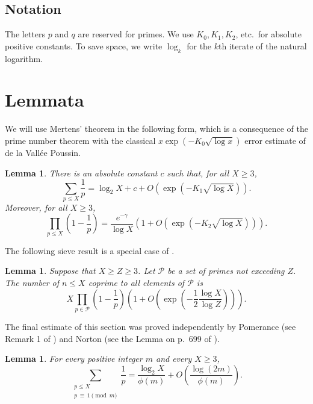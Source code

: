 \documentclass[11pt]{amsart}
\newtheorem{lem}[thm]{Lemma}
\theoremstyle{remark}
\begin{document}
\subsection*{Notation} The letters $p$ and $q$ are reserved for primes. We use $K_0, K_1, K_2$, etc.\ for absolute positive constants. To save space, we write $\log_k$ for the $k$th iterate of the natural logarithm.

\section{Lemmata}
We will use Mertens' theorem in the following form, which is a consequence of the prime number theorem with the classical $x\exp(-K_0\sqrt{\log{x}})$ error estimate of de la Vall\'ee Poussin.

\begin{lem}\label{lem:mertens} There is an absolute constant $c$ such that, for all $X\ge 3$,
\[ \sum_{p\le X} \frac{1}{p} = \log_2{X} + c + O(\exp(-K_1\sqrt{\log X})). \]
Moreover, for all $X\ge 3$,
\[ \prod_{p \le X}\left(1-\frac{1}{p}\right) = \frac{e^{-\gamma}}{\log{X}}\left(1+O(\exp(-K_2\sqrt{\log X}))\right). \]
\end{lem}

The following sieve result is a special case of \cite[Theorem 7.2]{HR74}.

\begin{lem}\label{lem:sieve} Suppose that $X \ge Z\ge 3$. Let $\mathcal{P}$ be a set of primes not exceeding $Z$. The number of $n\le X$ coprime to all elements of $\mathcal{P}$ is
\[ X \prod_{p \in \mathcal{P}} \left(1-\frac{1}{p}\right) \left(1 + O\left(\exp\left(-\frac{1}{2}\frac{\log X}{\log Z}\right)\right)\right). \]
\end{lem}

The final estimate of this section was proved independently by Pomerance (see Remark 1 of \cite{Pomerance77}) and Norton (see the Lemma on p.\ 699 of \cite{norton76}).

\begin{lem}\label{lem:reciprocals} For every positive integer $m$ and every $X\ge 3$,
\[ \sum_{\substack{p \le X \\ p \,\equiv\,1\!\!\!\!\pmod{m}}} \frac{1}{p}= \frac{\log_2{X}}{\phi(m)} + O\left(\frac{\log{(2m)}}{\phi(m)}\right).\]

\end{lem}
\end{document}
